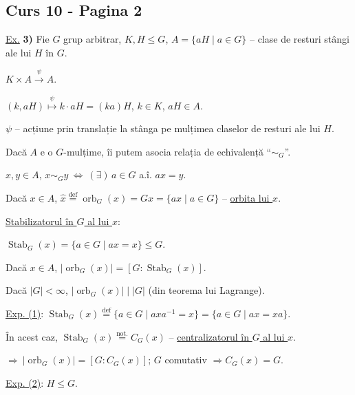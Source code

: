 
\subsection*{Curs 10 - Pagina 2}

\bigskip
\noindent\underline{Ex.} \textbf{3)} Fie $G$ grup arbitrar, $K,H\leq G$,
\quad $A=\{aH\mid a\in G\}$ -- clase de resturi stângi ale lui $H$ în $G$.

\bigskip
\noindent $K\times A\xrightarrow{\ \psi\ }A$.

\noindent $(k,aH)\overset{\psi}{\longmapsto}k\cdot aH=(ka)H$,
\quad $k\in K$, $aH\in A$.

\bigskip
\noindent $\psi$ -- acțiune prin translație la stânga pe mulțimea claselor
 de resturi ale lui $H$.

\bigskip
\noindent Dacă $A$ e o $G$-mulțime, îi putem asocia relația de
 echivalență ``$\sim_G$''.

\medskip
\noindent $x,y\in A$, \quad
$x\sim_G y\ \Longleftrightarrow\ (\exists)\,a\in G$ a.î. $ax=y$.

\bigskip
\noindent Dacă $x\in A$, \quad
$\widehat{x}\overset{\mathrm{def}}{=}\operatorname{orb}_G(x)
=Gx=\{ax\mid a\in G\}$ -- \underline{orbita lui $x$}.

\bigskip
\noindent\underline{Stabilizatorul în $G$ al lui $x$}:

\medskip
\noindent $\operatorname{Stab}_G(x)=\{a\in G\mid ax=x\}\leq G$.

\bigskip
\noindent Dacă $x\in A$, \quad
$\bigl|\operatorname{orb}_G(x)\bigr|
=[G:\operatorname{Stab}_G(x)]$.

\medskip
\noindent Dacă $|G|<\infty$, \quad
$\bigl|\operatorname{orb}_G(x)\bigr|\mid |G|$
(din teorema lui Lagrange).

\bigskip
\noindent\underline{Exp. (1)}:
\quad $\operatorname{Stab}_G(x)\overset{\mathrm{def}}{=}
\{a\in G\mid axa^{-1}=x\}
=\{a\in G\mid ax=xa\}$.

\medskip
\noindent În acest caz,
$\operatorname{Stab}_G(x)\overset{\mathrm{not.}}{=}C_G(x)$
-- \underline{centralizatorul în $G$ al lui $x$}.

\medskip
\noindent $\Longrightarrow\ \bigl|\operatorname{orb}_G(x)\bigr|
=[G:C_G(x)]$;
\quad $G$ comutativ $\Longrightarrow C_G(x)=G$.

\bigskip
\noindent\underline{Exp. (2)}: \quad $H\leq G$.

